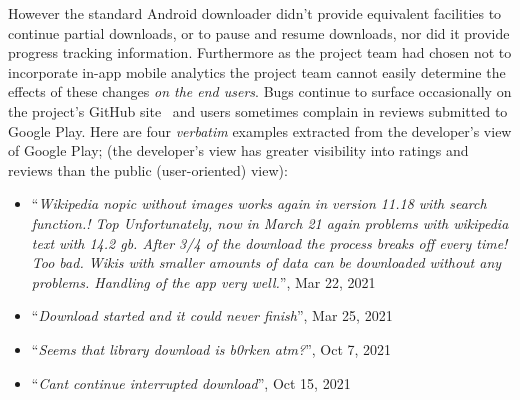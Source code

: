 However the standard Android downloader didn't provide equivalent facilities to continue partial downloads, or to pause and resume downloads, nor did it provide progress tracking information. Furthermore as the project team had chosen not to incorporate in-app mobile analytics the project team cannot easily determine the effects of these changes \emph{on the end users}. Bugs continue to surface occasionally on the project's GitHub site~ and users sometimes complain in reviews submitted to Google Play. Here are four \emph{verbatim} examples extracted from the developer's view of Google Play; (the developer's view has greater visibility into ratings and reviews than the public (user-oriented) view):

{\small
\begin{itemize}
    \itemsep0em
    \item ``\textit{Wikipedia nopic without images works again in version 11.18 with search function.! Top Unfortunately, now in March 21 again problems with wikipedia text with 14.2 gb. After 3/4 of the download the process breaks off every time! Too bad. Wikis with smaller amounts of data can be downloaded without any problems. Handling of the app very well.}'', Mar 22, 2021 %
    \item ``\textit{Download started and it could never finish}'', Mar 25, 2021 %
    \item ``\textit{Seems that library download is b0rken atm?}'', Oct 7, 2021 %
    \item ``\textit{Cant continue interrupted download}'', Oct 15, 2021 %
\end{itemize}
}

